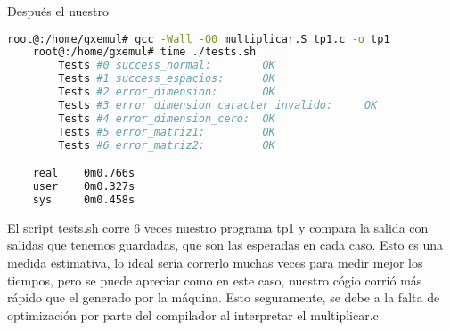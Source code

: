 \documentclass[a4paper,10pt]{article}
\begin{document}
Despu\'es el nuestro

\begin{lstlisting}[language=bash]
	root@:/home/gxemul# gcc -Wall -O0 multiplicar.S tp1.c -o tp1
	root@:/home/gxemul# time ./tests.sh 
        Tests #0 success_normal:        OK
        Tests #1 success_espacios:      OK
        Tests #2 error_dimension:       OK
        Tests #3 error_dimension_caracter_invalido:     OK
        Tests #4 error_dimension_cero:  OK
        Tests #5 error_matriz1:         OK
        Tests #6 error_matriz2:         OK

	real    0m0.766s
	user    0m0.327s
	sys     0m0.458s

\end{lstlisting}

El script tests.sh corre 6 veces nuestro programa tp1 y compara la salida con salidas que tenemos guardadas, que son las esperadas en cada caso. Esto es una medida estimativa, lo ideal ser\'ia correrlo muchas veces para medir mejor los tiempos, pero se puede apreciar como en este caso, nuestro c\'ogio corri\'o m\'as r\'apido que el generado por la m\'aquina. Esto seguramente, se debe a la falta de optimizaci\'on por parte del compilador al interpretar el multiplicar.c
\end{document}
